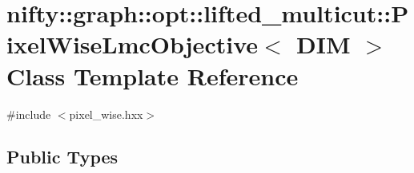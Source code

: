 \hypertarget{classnifty_1_1graph_1_1opt_1_1lifted__multicut_1_1PixelWiseLmcObjective}{}\section{nifty\+:\+:graph\+:\+:opt\+:\+:lifted\+\_\+multicut\+:\+:Pixel\+Wise\+Lmc\+Objective$<$ D\+IM $>$ Class Template Reference}
\label{classnifty_1_1graph_1_1opt_1_1lifted__multicut_1_1PixelWiseLmcObjective}


{\ttfamily \#include $<$pixel\+\_\+wise.\+hxx$>$}

\subsection*{Public Types}
